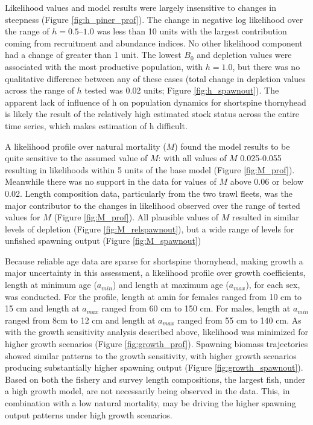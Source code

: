 \documentclass[11pt,
  english,
  letterpaper,
]{article}
\begin{document}
Likelihood values and model results were largely insensitive to changes in steepness (Figure \ref{fig:h_piner_prof}). The change in negative log likelihood over the range of \(h = 0.5–1.0\) was less than 10 units with the largest contribution coming from recruitment and abundance indices. No other likelihood component had a change of greater than 1 unit. The lowest \(B_0\) and depletion values were associated with the most productive population, with \(h = 1.0\), but there was no qualitative difference between any of these cases (total change in depletion values across the range of \(h\) tested was 0.02 units; Figure \ref{fig:h_spawnout}). The apparent lack of influence of h on population dynamics for shortspine thornyhead is likely the result of the relatively high estimated stock status across the entire time series, which makes estimation of h difficult.

A likelihood profile over natural mortality (\(M\)) found the model results to be quite sensitive to the assumed value of \(M\): with all values of \(M\) 0.025-0.055 resulting in likelihoods within 5 units of the base model (Figure \ref{fig:M_prof}). Meanwhile there was no support in the data for values of \(M\) above 0.06 or below 0.02. Length composition data, particularly from the two trawl fleets, was the major contributor to the changes in likelihood observed over the range of tested values for \(M\) (Figure \ref{fig:M_prof}). All plausible values of \(M\) resulted in similar levels of depletion (Figure \ref{fig:M_relspawnout}), but a wide range of levels for unfished spawning output (Figure \ref{fig:M_spawnout})

Because reliable age data are sparse for shortspine thornyhead, making growth a major uncertainty in this assessment, a likelihood profile over growth coefficients, length at minimum age (\(a_{min}\)) and length at maximum age (\(a_{max}\)), for each sex, was conducted. For the profile, length at amin for females ranged from 10 cm to 15 cm and length at \(a_{max}\) ranged from 60 cm to 150 cm. For males, length at \(a_{min}\) ranged from 8cm to 12 cm and length at \(a_{max}\) ranged from 55 cm to 140 cm. As with the growth sensitivity analysis described above, likelihood was minimized for higher growth scenarios (Figure \ref{fig:growth_prof}). Spawning biomass trajectories showed similar patterns to the growth sensitivity, with higher growth scenarios producing substantially higher spawning output (Figure \ref{fig:growth_spawnout}). Based on both the fishery and survey length compositions, the largest fish, under a high growth model, are not necessarily being observed in the data. This, in combination with a low natural mortality, may be driving the higher spawning output patterns under high growth scenarios.
\end{document}
